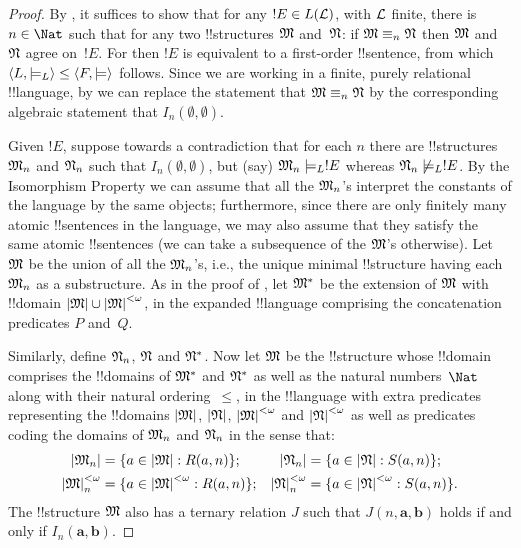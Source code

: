 \documentclass[../../../include/open-logic-section]{subfiles}
\begin{document}
\begin{proof}
By , it suffices to show that for any $!E
\in L(\mathcal L)$, with $\mathcal L$ finite, there is $n \in \Nat$
such that for any two !!{structure}s $\mathfrak M$ and~$\mathfrak N$: if
$\mathfrak M \equiv_n \mathfrak N$ then $\mathfrak M$ and $\mathfrak N$
agree on~$!E$. For then $!E$ is equivalent to a first-order
!!{sentence}, from which $\langle L, \models_L \rangle \le \langle F, \models \rangle$
follows. Since we are working in a finite, purely relational
!!{language}, by  we can replace the statement
that $\mathfrak M \equiv_n \mathfrak N$ by the corresponding algebraic
statement that $I_n(\emptyset,\emptyset)$.

Given $!E$, suppose towards a contradiction that for each $n$ there
are !!{structure}s $\mathfrak M_n$ and $\mathfrak N_n$ such that
$I_n(\emptyset, \emptyset)$, but (say) $\mathfrak M_n \models_L !E$
whereas $\mathfrak N_n \not\models_L !E$. By the Isomorphism Property
we can assume that all the $\mathfrak M_n$'s interpret the constants of
the language by the same objects; furthermore, since there are only
finitely many atomic !!{sentence}s in the language, we may also assume
that they satisfy the same atomic !!{sentence}s (we can take a
subsequence of the $\mathfrak M$'s otherwise). Let $\mathfrak M$ be the
union of all the $\mathfrak M_n$'s, i.e., the unique minimal
!!{structure} having each $\mathfrak M_n$ as a substructure.  As in the
proof of , let $\mathfrak M^*$ be the
extension of $\mathfrak M$ with !!{domain} $\left| \mathfrak M \right| \cup
\left| \mathfrak M \right|^{<\omega}$, in the expanded !!{language} comprising the
concatenation predicates $P$ and~$Q$.

Similarly, define $\mathfrak N_n$, $\mathfrak N$ and $\mathfrak N^*$. Now
let $\mathfrak M$ be the !!{structure} whose !!{domain} comprises the
!!{domain}s of $\mathfrak M^*$ and $\mathfrak N^*$ as well as the natural
numbers~$\Nat$ along with their natural ordering~$\le$, in the
!!{language} with extra predicates representing the !!{domain}s
$\left| \mathfrak M \right|$, $\left| \mathfrak N \right|$, $\left| \mathfrak M \right|^{<\omega}$ and
$\left| \mathfrak N \right|^{<\omega}$ as well as predicates coding the domains of
$\mathfrak M_n$ and $\mathfrak N_n$ in the sense that:
\begin{align*}
  \Domain{M_n} & = \Setabs{a \in \Domain{M}}{R(a, n)}; & 
  \Domain{N_n} & = \Setabs{a \in \Domain{N}}{S(a,n)}; \\
  \Domain{M}^{<\omega}_n & = \Setabs{a \in \Domain{M}^{<\omega}}{R(a,n)}; &
  \Domain{N}^{<\omega}_n & = \Setabs{a \in \Domain{N}^{<\omega}}{S(a,n)}. 
\end{align*}
The !!{structure} $\mathfrak M$ also has a ternary relation $J$ such
that $J(n, \mathbf{a}, \mathbf{b})$ holds if and only if
$I_n(\mathbf{a}, \mathbf{b})$.


\end{proof}
\end{document}
